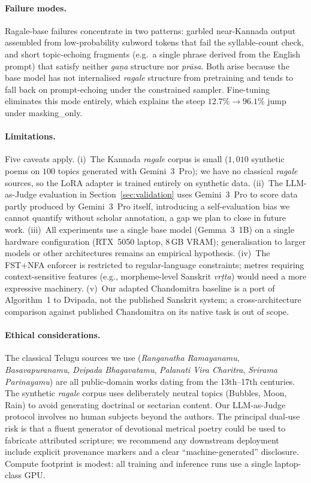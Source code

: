 \documentclass[11pt]{article}
\begin{document}
\paragraph{Failure modes.}
Ragale-base failures concentrate in two patterns: garbled near-Kannada
output assembled from low-probability subword tokens that fail the
syllable-count check, and short topic-echoing fragments (e.g.\ a single
phrase derived from the English prompt) that satisfy neither
\textit{ga\d{n}a} structure nor \textit{pr\={a}sa}. Both arise because
the base model has not internalised \textit{ragale} structure from
pretraining and tends to fall back on prompt-echoing under the constrained
sampler. Fine-tuning eliminates this mode entirely, which explains the
steep $12.7\% \to 96.1\%$ jump under masking\_only.

\paragraph{Limitations.}
Five caveats apply. (i)~The Kannada \textit{ragale} corpus is small
($1{,}010$ synthetic poems on $100$ topics generated with
Gemini~3~Pro); we have no classical \textit{ragale} sources, so the
LoRA adapter is trained entirely on synthetic data. (ii)~The
LLM-as-Judge evaluation in Section~\ref{sec:validation} uses
Gemini~3~Pro to score data partly produced by Gemini~3~Pro itself,
introducing a self-evaluation bias we cannot quantify without scholar
annotation, a gap we plan to close in future work. (iii)~All
experiments use a single base model (Gemma~3~1B) on a single hardware
configuration (RTX~5050 laptop, 8\,GB VRAM); generalisation to larger
models or other architectures remains an empirical hypothesis.
(iv)~The FST+NFA enforcer is restricted to regular-language
constraints; metres requiring context-sensitive features (e.g.,
morpheme-level Sanskrit \textit{vr\d{t}ta}) would need a more
expressive machinery. (v)~Our adapted Chandomitra baseline is a port
of Algorithm~1 to Dvipada, not the published Sanskrit system; a
cross-architecture comparison against published Chandomitra on its
native task is out of scope.

\paragraph{Ethical considerations.}
The classical Telugu sources we use (\textit{Ranganatha Ramayanamu},
\textit{Basavapuranamu}, \textit{Dvipada Bhagavatamu},
\textit{Palanati Vira Charitra}, \textit{Srirama Parinayamu}) are all
public-domain works dating from the 13th--17th centuries. The
synthetic \textit{ragale} corpus uses deliberately neutral topics
(Bubbles, Moon, Rain) to avoid generating doctrinal or sectarian
content. Our LLM-as-Judge protocol involves no human subjects beyond
the authors. The principal dual-use risk is that a fluent generator of
devotional metrical poetry could be used to fabricate attributed
scripture; we recommend any downstream deployment include explicit
provenance markers and a clear ``machine-generated'' disclosure.
Compute footprint is modest: all training and inference runs use a
single laptop-class GPU.
\end{document}
